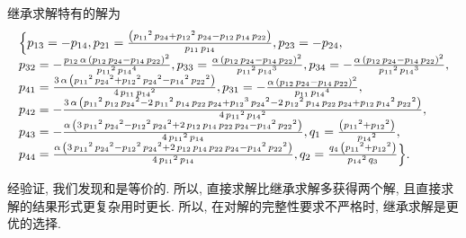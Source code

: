 继承求解特有的解为 
\begin{equation}
\renewcommand{\arraystretch}{1.2}
\begin{array}{l}
\dbrace{
{{p}_{13}}=-{{p}_{14}},
{{p}_{21}}=\frac{\left( {{{p}_{11}}}^{2}\,{{p}_{24}}+{{{p}_{12}}}^{2}\,{{p}_{24}}-{{p}_{12}}\,{{p}_{14}}\,{{p}_{22}}\right) }{{{p}_{11}}\,{{p}_{14}}},
{{p}_{23}}=-{{p}_{24}},\\
{{p}_{32}}=-\frac{{{p}_{12}}\,\alpha\,\left( {{p}_{12}}\,{{p}_{24}}-{{p}_{14}}\,{{p}_{22}}\right) ^{2}}{{{{p}_{11}}}^{2}\,{{{p}_{14}}}^{4}},
{{p}_{33}}=\frac{\alpha\,\left( {{p}_{12}}\,{{p}_{24}}-{{p}_{14}}\,{{p}_{22}}\right) ^{2}}{{{{p}_{11}}}^{2}\,{{{p}_{14}}}^{3}},
{{p}_{34}}=-\frac{\alpha\,\left( {{p}_{12}}\,{{p}_{24}}-{{p}_{14}}\,{{p}_{22}}\right) ^{2}}{{{{p}_{11}}}^{2}\,{{{p}_{14}}}^{3}},\\
{{p}_{41}}=\frac{3\,\alpha\,\left( {{{p}_{11}}}^{2}\,{{{p}_{24}}}^{2}+{{{p}_{12}}}^{2}\,{{{p}_{24}}}^{2}-{{{p}_{14}}}^{2}\,{{{p}_{22}}}^{2}\right) }{4\,{{p}_{11}}\,{{{p}_{14}}}^{2}},
{{p}_{31}}=-\frac{\alpha\,\left( {{p}_{12}}\,{{p}_{24}}-{{p}_{14}}\,{{p}_{22}}\right) ^{2}}{{{p}_{11}}\,{{{p}_{14}}}^{4}},\\
{{p}_{42}}=-\frac{3\,\alpha\,\left( {{{p}_{11}}}^{2}\,{{p}_{12}}\,{{{p}_{24}}}^{2}-2\,{{{p}_{11}}}^{2}\,{{p}_{14}}\,{{p}_{22}}\,{{p}_{24}}+{{{p}_{12}}}^{3}\,{{{p}_{24}}}^{2}-2\,{{{p}_{12}}}^{2}\,{{p}_{14}}\,{{p}_{22}}\,{{p}_{24}}+{{p}_{12}}\,{{{p}_{14}}}^{2}\,{{{p}_{22}}}^{2}\right) }{4\,{{{p}_{11}}}^{2}\,{{{p}_{14}}}^{2}},\\ 
{{p}_{43}}=-\frac{\alpha\,\left( 3\,{{{p}_{11}}}^{2}\,{{{p}_{24}}}^{2}-{{{p}_{12}}}^{2}\,{{{p}_{24}}}^{2}+2\,{{p}_{12}}\,{{p}_{14}}\,{{p}_{22}}\,{{p}_{24}}-{{{p}_{14}}}^{2}\,{{{p}_{22}}}^{2}\right) }{4\,{{{p}_{11}}}^{2}\,{{p}_{14}}},
{{q}_{1}}=\frac{\left( {{{p}_{11}}}^{2}+{{{p}_{12}}}^{2}\right) }{{{{p}_{14}}}^{2}},\\ 
{{p}_{44}}=\frac{\alpha\,\left( 3\,{{{p}_{11}}}^{2}\,{{{p}_{24}}}^{2}-{{{p}_{12}}}^{2}\,{{{p}_{24}}}^{2}+2\,{{p}_{12}}\,{{p}_{14}}\,{{p}_{22}}\,{{p}_{24}}-{{{p}_{14}}}^{2}\,{{{p}_{22}}}^{2}\right) }{4\,{{{p}_{11}}}^{2}\,{{p}_{14}}},
{{q}_{2}}=\frac{{{q}_{4}}\,\left( {{{p}_{11}}}^{2}+{{{p}_{12}}}^{2}\right) }{{{{p}_{14}}}^{2}\,{{q}_{3}}}
}.
\end{array}\label{2S1L-plot}
\end{equation}

经验证, 我们发现和是等价的. 所以, 直接求解比继承求解多获得两个解, 且直接求解的结果形式更复杂\D 用时更长. 所以, 在对解的完整性要求不严格时, 继承求解是更优的选择.


